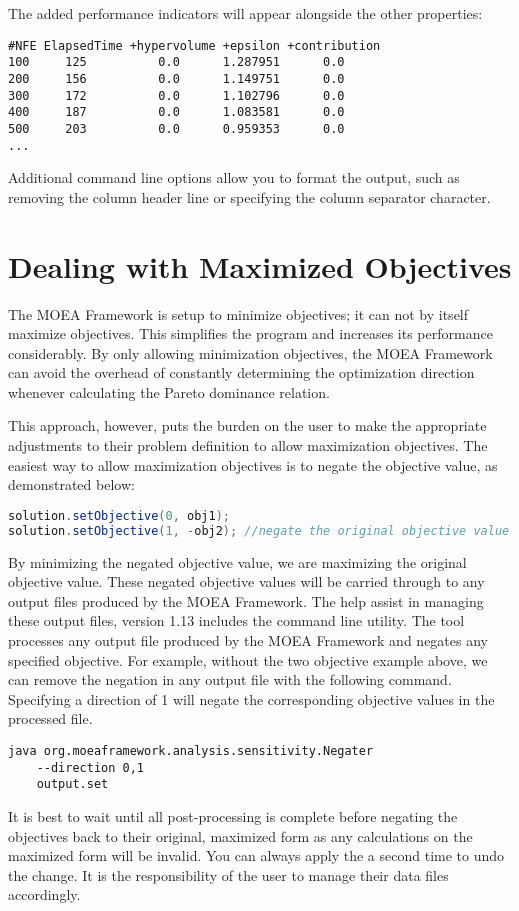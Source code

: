 The added performance indicators will appear alongside the other properties:

\begin{lstlisting}[language=Plaintext]
#NFE ElapsedTime +hypervolume +epsilon +contribution
100     125          0.0      1.287951      0.0
200     156          0.0      1.149751      0.0
300     172          0.0      1.102796      0.0
400     187          0.0      1.083581      0.0
500     203          0.0      0.959353      0.0
...
\end{lstlisting}

Additional command line options allow you to format the output, such as removing the column header line or specifying the column separator character.

\section{Dealing with Maximized Objectives}
\label{sect:maximizing}
The MOEA Framework is setup to minimize objectives; it can not by itself maximize objectives.  This simplifies the program and increases its performance considerably.  By only allowing minimization objectives, the MOEA Framework can avoid the overhead of constantly determining the optimization direction whenever calculating the Pareto dominance relation.

This approach, however, puts the burden on the user to make the appropriate adjustments to their problem definition to allow maximization objectives.  The easiest way to allow maximization objectives is to negate the objective value, as demonstrated below:

\begin{lstlisting}[language=Java]
solution.setObjective(0, obj1);
solution.setObjective(1, -obj2); //negate the original objective value
\end{lstlisting}

By minimizing the negated objective value, we are maximizing the original objective value.  These negated objective values will be carried through to any output files produced by the MOEA Framework.  The help assist in managing these output files, version 1.13 includes the  command line utility.  The  tool processes any output file produced by the MOEA Framework and negates any specified objective.  For example, without the two objective example above, we can remove the negation in any output file with the following command.  Specifying a direction of 1 will negate the corresponding objective values in the processed file.

\begin{lstlisting}[language=Plaintext]
java org.moeaframework.analysis.sensitivity.Negater
    --direction 0,1
    output.set
\end{lstlisting}

\begin{important}
It is best to wait until all post-processing is complete before negating the objectives back to their original, maximized form as any calculations on the maximized form will be invalid.  You can always apply the  a second time to undo the change.  It is the responsibility of the user to manage their data files accordingly.
\end{important}